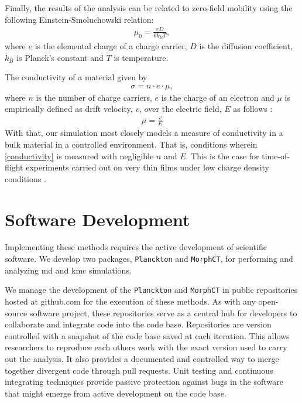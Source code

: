 Finally, the results of the  analysis can be related to  zero-field mobility using the following Einstein-Smoluchowski relation:
\begin{align}
    \label{einstein}
    \mu_{0} = \frac{eD}{6k_{B}T},
\end{align}
where $e$ is the elemental charge of a charge carrier, $D$ is the diffusion coefficient, $k_{B}$ is Planck's
constant and $T$ is temperature. 

The conductivity of a material given by 
\begin{align}
    \label{conductivity}
    \sigma = n \cdot e \cdot \mu,
\end{align}
where $n$ is the number of charge carriers, $e$ is the charge of an electron and $\mu$ is empirically
defined as drift velocity, $v$, over the electric field, $E$ as follows \cite{Kokil2012}:
\begin{align}
    \label{m}
    \mu = \frac{v}{E}
\end{align}
With that, our  simulation most closely models a measure of conductivity in a bulk material in a controlled
environment. That is, conditions wherein \autoref{conductivity} is measured with negligible $n$ and $E$.
This is the case for time-of-flight experiments carried out on very thin films under low charge density
conditions \cite{Chen2000a}.

\section{Software Development}

\label{software-methods}
Implementing these methods requires the active development of scientific software. We develop two packages, 
\texttt{Planckton} and \texttt{MorphCT}, for performing and analyzing \gls{md} and \gls{kmc} simulations.  

We manage the development of the \texttt{Planckton} and \texttt{MorphCT} in public repositories hosted at github.com\cite{cmelab} for the execution of these methods.
As with any open-source software project, these repositories serve as a
central hub for developers to collaborate and integrate code into the code base. Repositories are
version controlled with a snapshot of the code base saved at each iteration. This allows researchers to 
reproduce each others work with the exact version used to carry out the analysis. It also provides a
documented and controlled way to merge together divergent code through pull requests. Unit testing and
continuous integrating techniques provide passive protection against bugs in the software that might emerge
from active development on the code base. 

